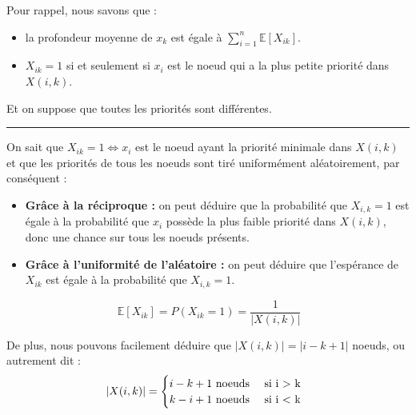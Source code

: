 \documentclass[a4paper,12pt]{report}
\begin{document}
\begin{tcolorbox}[colback=gray!10, colframe=blue!30, coltitle=black, title=Réponse à la 6.c - 1/3]

    Pour rappel, nous savons que :\\[-0.4cm]
    \begin{itemize}
        \item la profondeur moyenne de \( x_k \) est égale à \(\sum_{i = 1}^{n} \mathbb{E}[X_{ik}]\).
        \item \( X_{ik} = 1 \) si et seulement si \( x_i \) est le noeud qui a la plus petite priorité dans \( X(i,k) \).
    \end{itemize}

    Et on suppose que toutes les priorités sont différentes.

    \vspace{0.5cm}
    \hrule
    \vspace{0.5cm}

    On sait que \( X_{ik} = 1 \Longleftrightarrow x_i \) est le noeud ayant la priorité minimale dans \( X(i,k) \) et que les priorités de tous les noeuds sont 
        tiré uniformément aléatoirement, par conséquent :\\[-0.4cm]
    \begin{itemize}
        \item \textbf{Grâce à la réciproque :} on peut déduire que la probabilité que \( X_{i,k} = 1 \) est égale à la probabilité que \( x_i \) possède la plus faible
            priorité dans \(X(i,k)\), donc une chance sur tous les noeuds présents.
        \item \textbf{Grâce à l'uniformité de l'aléatoire :} on peut déduire que l'espérance de \( X_{ik} \) est égale à la probabilité que \( X_{i,k} = 1 \).
    \end{itemize}
        
    \[
    \ \mathbb{E}[X_{ik}] = P(X_{ik} = 1) = \frac{1}{|X(i,k)|}
    \] 

    \vspace{0.5cm}

    De plus, nous pouvons facilement déduire que \( |X(i,k)| = | i - k + 1 | \) noeuds, ou autrement dit :
    \[
    \ |X(i,k)| =
    \begin{cases}
        i - k + 1 \text{ noeuds \quad si i > k} \\
        k - i + 1 \text{ noeuds \quad si i < k} 
    \end{cases}
    \]

    \vspace{0.5cm}


\end{tcolorbox}
\end{document}

